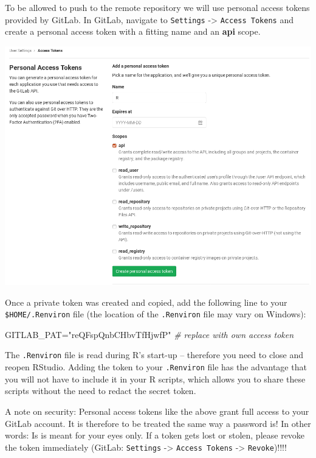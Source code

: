 \documentclass[]{book}
\newenvironment{Shaded}{\begin{snugshade}}{\end{snugshade}}
\newcommand{\CommentTok}[1]{\textcolor[rgb]{0.56,0.35,0.01}{\textit{#1}}}
\newcommand{\NormalTok}[1]{#1}
\newcommand{\StringTok}[1]{\textcolor[rgb]{0.31,0.60,0.02}{#1}}
\begin{document}
To be allowed to push to the remote repository we will use personal access tokens provided by GitLab. In GitLab, navigate to \texttt{Settings} -\textgreater{} \texttt{Access\ Tokens} and create a personal access token with a fitting name and an \textbf{api} scope.

\begin{center}\includegraphics[width=0.75\linewidth]{pics/GitLab-AccessTokens} \end{center}

Once a private token was created and copied, add the following line to your \texttt{\$HOME/.Renviron} file (the location of the \texttt{.Renviron} file may vary on Windows):

\begin{Shaded}
\begin{Highlighting}[]
\NormalTok{GITLAB_PAT=}\StringTok{"reQFspQnbCHbvTfHjwfP"} \CommentTok{# replace with own access token}
\end{Highlighting}
\end{Shaded}

The \texttt{.Renviron} file is read during R's start-up -- therefore you need to close and reopen RStudio. Adding the token to your \texttt{.Renviron} file has the advantage that you will not have to include it in your R scripts, which allows you to share these scripts without the need to redact the secret token.

A note on security: Personal access tokens like the above grant full access to your GitLab account. It is therefore to be treated the same way a password is! In other words: Is is meant for your eyes only. If a token gets lost or stolen, please revoke the token immediately (GitLab: \texttt{Settings} -\textgreater{} \texttt{Access\ Tokens} -\textgreater{} \texttt{Revoke})!!!!
\end{document}
